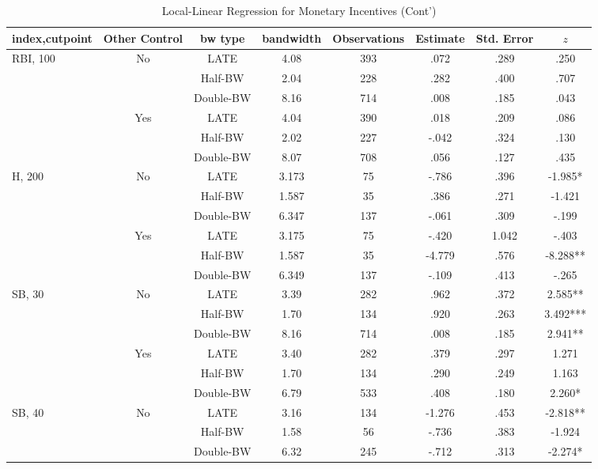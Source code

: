 \documentclass[dvipdfmx,12pt]{beamer}
\begin{document}
\begin{frame}\frametitle{}
  \begin{table}[!]
    \caption{Local-Linear Regression for Monetary Incentives (Cont')}
    \label{RDD_B}
    \tiny
    \centering
    \begin{tabular}{lccccccc}\hline
      index,cutpoint & Other Control & bw type & bandwidth
      & Observations & Estimate & Std. Error & $z$
      \\ \hline \hline
      RBI, 100 & No & LATE & 4.08 & 393 & .072 & .289 & .250 \\
      & &Half-BW & 2.04 & 228 & .282 & .400 & .707 \\
      & &Double-BW & 8.16 & 714 & .008 & .185 & .043 \\ \cline{3-8}

      & Yes & LATE & 4.04 & 390 & .018 & .209 & .086 \\
      & & Half-BW & 2.02 & 227 & -.042 & .324 & .130 \\
      & & Double-BW & 8.07 & 708 & .056 & .127 & .435 \\ \hline

      H, 200& No & LATE & 3.173 & 75 & -.786 & .396 & -1.985* \\
      & & Half-BW & 1.587 & 35 & .386 & .271 & -1.421 \\
      & & Double-BW & 6.347 & 137 & -.061 & .309 & -.199 \\ \cline{3-8}

      & Yes & LATE & 3.175 & 75 & -.420 & 1.042 & -.403 \\
      & & Half-BW & 1.587 & 35 & -4.779 & .576 & -8.288** \\
      & & Double-BW & 6.349 & 137 & -.109 & .413 & -.265 \\ \hline

      SB, 30 & No & LATE & 3.39 & 282 & .962 & .372 & 2.585** \\
      & &Half-BW & 1.70 & 134 & .920 & .263 & 3.492*** \\
      & &Double-BW & 8.16 & 714 & .008 & .185 & 2.941** \\ \cline{3-8}

      & Yes & LATE & 3.40 & 282 & .379 & .297 & 1.271 \\
      & & Half-BW & 1.70 & 134 & .290 & .249 & 1.163 \\
      & & Double-BW & 6.79 & 533 & .408 & .180 & 2.260* \\ \hline

      SB, 40 & No & LATE & 3.16 & 134 & -1.276 & .453 & -2.818** \\
      & &Half-BW & 1.58 & 56 & -.736 & .383 & -1.924 \\
      & &Double-BW & 6.32 & 245 & -.712 & .313 & -2.274* \\ \cline{3-8}


\end{tabular}
\end{table}
\end{frame}
\end{document}
